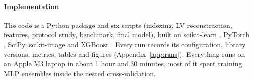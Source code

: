 \paragraph{Implementation}
The code is a Python package and six scripts (indexing, LV reconstruction, features, protocol study, benchmark, final model), built on scikit-learn \citep{pedregosa2011}, PyTorch \citep{paszke2019}, SciPy, scikit-image and XGBoost \citep{chen2016}. Every run records its configuration, library versions, metrics, tables and figures (Appendix~\ref{app:runs}). Everything runs on an Apple M3 laptop in about 1 hour and 30 minutes, most of it spent training MLP ensembles inside the nested cross-validation.
